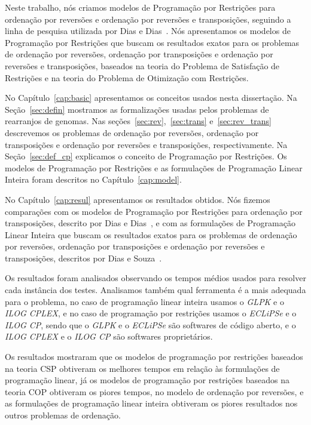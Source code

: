 Neste trabalho, nós criamos modelos de Programação por Restrições para
ordenação por reversões e ordenação por reversões e transposições,
seguindo a linha de pesquisa utilizada por Dias e
Dias~\cite{DiasDias*2009}. Nós apresentamos os modelos de Programação
por Restrições que buscam os resultados exatos para os problemas de
ordenação por reversões, ordenação por transposições e ordenação por
reversões e transposições, baseados na teoria do Problema de Satisfação
de Restrições e na teoria do Problema de Otimização com Restrições.

No Capítulo~\ref{cap:basic} apresentamos os conceitos usados nesta
dissertação. Na Seção~\ref{sec:defin} mostramos as formalizações usadas
pelos problemas de rearranjos de genomas. Nas
seções~\ref{sec:rev},~\ref{sec:trans} e~\ref{sec:rev_trans} descrevemos
os problemas de ordenação por reversões, ordenação por transposições e
ordenação por reversões e transposições, respectivamente. Na
Seção~\ref{sec:def_cp} explicamos o conceito de Programação por
Restrições. Os modelos de Programação por Restrições e as formulações de
Programação Linear Inteira foram descritos no Capítulo~\ref{cap:model}.

No Capítulo~\ref{cap:resul} apresentamos os resultados obtidos. Nós
fizemos comparações com os modelos de Programação por Restrições para
ordenação por transposições, descrito por Dias e
Dias~\cite{DiasDias*2009}, e com as formulações de Programação Linear
Inteira que buscam os resultados exatos para os problemas de ordenação
por reversões, ordenação por transposições e ordenação por reversões e
transposições, descritos por Dias e Souza~\cite{DiasSouza*2007}.

Os resultados foram analisados observando os tempos médios usados para
resolver cada instância dos testes. Analisamos também qual ferramenta
é a mais adequada para o problema, no caso de programação linear
inteira usamos o \textit{GLPK} e o \textit{ILOG CPLEX}, e no caso de
programação por restrições usamos o \textit{ECLiPSe} e o \textit{ILOG
CP}, sendo que o \textit{GLPK} e o \textit{ECLiPSe} são softwares de
código aberto, e o \textit{ILOG CPLEX} e o \textit{ILOG CP} são
softwares proprietários.

Os resultados mostraram que os modelos de programação por restrições
baseados na teoria CSP obtiveram os melhores tempos em relação às
formulações de programação linear, já os modelos de programação por
restrições baseados na teoria COP obtiveram os piores tempos, no
modelo de ordenação por reversões, e as formulações de programação
linear inteira obtiveram os piores resultados nos outros problemas de
ordenação.

